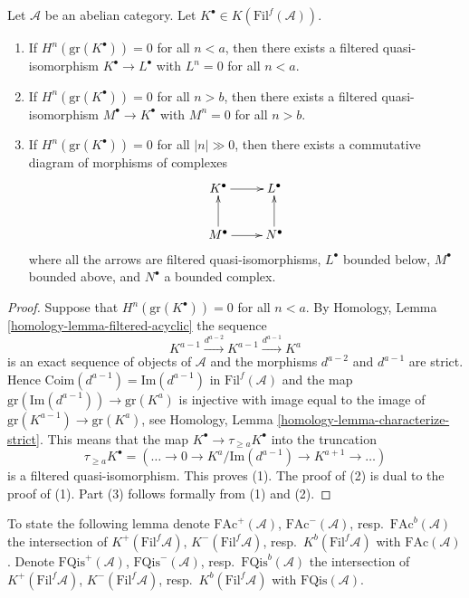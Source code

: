 \begin{lemma}
\label{lemma-filtered-complex-cohomology-bounded}
Let $\mathcal{A}$ be an abelian category.
Let $K^\bullet \in K(\text{Fil}^f(\mathcal{A}))$.
\begin{enumerate}
\item If $H^n(\text{gr}(K^\bullet)) = 0$ for all $n < a$, then there exists
a filtered quasi-isomorphism $K^\bullet \to L^\bullet$ with
$L^n = 0$ for all $n < a$.
\item If $H^n(\text{gr}(K^\bullet)) = 0$ for all $n > b$, then there exists
a filtered quasi-isomorphism $M^\bullet \to K^\bullet$ with
$M^n = 0$ for all $n > b$.
\item If $H^n(\text{gr}(K^\bullet)) = 0$ for all $|n| \gg 0$, then there
exists a commutative diagram of morphisms of complexes
$$
\xymatrix{
K^\bullet \ar[r] & L^\bullet \\
M^\bullet \ar[u] \ar[r] & N^\bullet \ar[u]
}
$$
where all the arrows are filtered quasi-isomorphisms, $L^\bullet$
bounded below, $M^\bullet$ bounded above, and $N^\bullet$ a bounded
complex.
\end{enumerate}
\end{lemma}

\begin{proof}
Suppose that $H^n(\text{gr}(K^\bullet)) = 0$ for all $n < a$. By
Homology, Lemma \ref{homology-lemma-filtered-acyclic}
the sequence
$$
K^{a - 1} \xrightarrow{d^{a - 2}} K^{a - 1} \xrightarrow{d^{a - 1}} K^a
$$
is an exact sequence of objects of $\mathcal{A}$ and the morphisms
$d^{a - 2}$ and $d^{a - 1}$ are strict. Hence
$\text{Coim}(d^{a - 1}) = \text{Im}(d^{a - 1})$ in $\text{Fil}^f(\mathcal{A})$
and the map $\text{gr}(\text{Im}(d^{a - 1})) \to \text{gr}(K^a)$
is injective with image equal to the image of
$\text{gr}(K^{a - 1}) \to \text{gr}(K^a)$, see
Homology, Lemma \ref{homology-lemma-characterize-strict}.
This means that the map $K^\bullet \to \tau_{\geq a}K^\bullet$
into the truncation
$$
\tau_{\geq a}K^\bullet =
(\ldots \to 0 \to K^a/\text{Im}(d^{a - 1}) \to K^{a + 1} \to \ldots)
$$
is a filtered quasi-isomorphism. This proves (1). The proof of (2)
is dual to the proof of (1). Part (3) follows formally from (1) and (2).
\end{proof}

\noindent
To state the following lemma denote
$\text{FAc}^{+}(\mathcal{A})$, $\text{FAc}^{-}(\mathcal{A})$,
resp.\ $\text{FAc}^b(\mathcal{A})$ the intersection of
$K^{+}(\text{Fil}^f\mathcal{A})$, $K^{-}(\text{Fil}^f\mathcal{A})$,
resp.\ $K^b(\text{Fil}^f\mathcal{A})$ with $\text{FAc}(\mathcal{A})$.
Denote $\text{FQis}^{+}(\mathcal{A})$, $\text{FQis}^{-}(\mathcal{A})$,
resp.\ $\text{FQis}^b(\mathcal{A})$ the intersection of
$K^{+}(\text{Fil}^f\mathcal{A})$, $K^{-}(\text{Fil}^f\mathcal{A})$,
resp.\ $K^b(\text{Fil}^f\mathcal{A})$ with $\text{FQis}(\mathcal{A})$.

